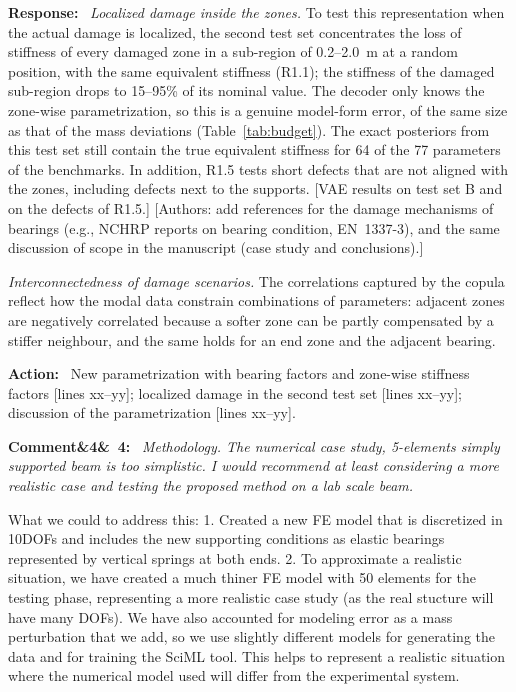 \documentclass[11pt]{article}
\newenvironment{rcomment}[1]{\par\bigskip\noindent\textbf{Comment\ifx&#1&\else\ #1\fi:}\ \itshape}{\par}
\newenvironment{response}{\par\smallskip\noindent\color{resp}\textbf{Response:}\ }{\par}
\newenvironment{action}{\par\smallskip\noindent\color{resp}\textbf{Action:}\ }{\par}
\newcommand{\authornote}[1]{\textcolor{note}{\textsf{[Authors: #1]}}}
\newcommand{\tbd}[1]{\textcolor{note}{\textsf{[#1]}}}
\newcommand{\lines}[1]{\tbd{lines #1}}
\begin{document}
\begin{response}
\textit{Localized damage inside the zones.} To test this representation when the actual damage is localized, the second
test set concentrates the loss of stiffness of every damaged zone in a sub-region of 0.2--2.0~m at a random position,
with the same equivalent stiffness (R1.1); the stiffness of the damaged sub-region drops to 15--95\% of its nominal value.
The decoder only knows the zone-wise parametrization, so this is a genuine model-form error, of the same size as that of
the mass deviations (Table~\ref{tab:budget}). The exact posteriors from this test set still contain the true equivalent
stiffness for 64 of the 77 parameters of the benchmarks. In addition, R1.5 tests short defects that are not aligned with
the zones, including defects next to the supports.
\tbd{VAE results on test set B and on the defects of R1.5.}
\authornote{add references for the damage mechanisms of bearings (e.g., NCHRP reports on bearing condition, EN~1337-3), and the same discussion of scope in the
manuscript (case study and conclusions).}

\textit{Interconnectedness of damage scenarios.} The correlations captured by the copula reflect how the modal data
constrain combinations of parameters: adjacent zones are negatively correlated because a softer zone can be partly
compensated by a stiffer neighbour, and the same holds for an end zone and the adjacent bearing.
\end{response}

\begin{action}
New parametrization with bearing factors and zone-wise stiffness factors \lines{xx--yy}; localized damage in the
second test set \lines{xx--yy}; discussion of the parametrization \lines{xx--yy}.
\end{action}

\begin{rcomment}{4}
Methodology. The numerical case study, 5-elements simply supported beam is too simplistic. I would recommend at least
considering a more realistic case and testing the proposed method on a lab scale beam.
\end{rcomment}

What we could to address this:
1. Created a new FE model that is discretized in 10DOFs and includes the new supporting conditions as elastic bearings represented by vertical springs at both ends. 
2. To approximate a realistic situation, we have created a much thiner FE model with 50 elements for the testing phase, representing a more realistic case study (as the real stucture will have many DOFs). 
We have also accounted for modeling error as a mass perturbation that we add, so we use slightly different models for generating the data and for training the SciML tool. This helps to represent a realistic situation where the numerical model used will differ from the experimental system. 
\end{document}
